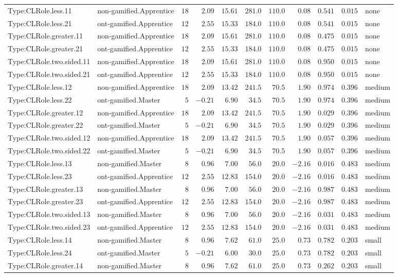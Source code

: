 \documentclass[6pt,a4paper]{article}
\begin{document}
{\begin{longtable}{llrrrrrrrrl}
Type:CLRole.less.11&non-gamified.Apprentice&$18$&$ 2.09$&$15.61$&$281.0$&$110.0$&$ 0.08$&$0.541$&$0.015$&none\tabularnewline
Type:CLRole.less.21&ont-gamified.Apprentice&$12$&$ 2.55$&$15.33$&$184.0$&$110.0$&$ 0.08$&$0.541$&$0.015$&none\tabularnewline
Type:CLRole.greater.11&non-gamified.Apprentice&$18$&$ 2.09$&$15.61$&$281.0$&$110.0$&$ 0.08$&$0.475$&$0.015$&none\tabularnewline
Type:CLRole.greater.21&ont-gamified.Apprentice&$12$&$ 2.55$&$15.33$&$184.0$&$110.0$&$ 0.08$&$0.475$&$0.015$&none\tabularnewline
Type:CLRole.two.sided.11&non-gamified.Apprentice&$18$&$ 2.09$&$15.61$&$281.0$&$110.0$&$ 0.08$&$0.950$&$0.015$&none\tabularnewline
Type:CLRole.two.sided.21&ont-gamified.Apprentice&$12$&$ 2.55$&$15.33$&$184.0$&$110.0$&$ 0.08$&$0.950$&$0.015$&none\tabularnewline
Type:CLRole.less.12&non-gamified.Apprentice&$18$&$ 2.09$&$13.42$&$241.5$&$ 70.5$&$ 1.90$&$0.974$&$0.396$&medium\tabularnewline
Type:CLRole.less.22&ont-gamified.Master&$ 5$&$-0.21$&$ 6.90$&$ 34.5$&$ 70.5$&$ 1.90$&$0.974$&$0.396$&medium\tabularnewline
Type:CLRole.greater.12&non-gamified.Apprentice&$18$&$ 2.09$&$13.42$&$241.5$&$ 70.5$&$ 1.90$&$0.029$&$0.396$&medium\tabularnewline
Type:CLRole.greater.22&ont-gamified.Master&$ 5$&$-0.21$&$ 6.90$&$ 34.5$&$ 70.5$&$ 1.90$&$0.029$&$0.396$&medium\tabularnewline
Type:CLRole.two.sided.12&non-gamified.Apprentice&$18$&$ 2.09$&$13.42$&$241.5$&$ 70.5$&$ 1.90$&$0.057$&$0.396$&medium\tabularnewline
Type:CLRole.two.sided.22&ont-gamified.Master&$ 5$&$-0.21$&$ 6.90$&$ 34.5$&$ 70.5$&$ 1.90$&$0.057$&$0.396$&medium\tabularnewline
Type:CLRole.less.13&non-gamified.Master&$ 8$&$ 0.96$&$ 7.00$&$ 56.0$&$ 20.0$&$-2.16$&$0.016$&$0.483$&medium\tabularnewline
Type:CLRole.less.23&ont-gamified.Apprentice&$12$&$ 2.55$&$12.83$&$154.0$&$ 20.0$&$-2.16$&$0.016$&$0.483$&medium\tabularnewline
Type:CLRole.greater.13&non-gamified.Master&$ 8$&$ 0.96$&$ 7.00$&$ 56.0$&$ 20.0$&$-2.16$&$0.987$&$0.483$&medium\tabularnewline
Type:CLRole.greater.23&ont-gamified.Apprentice&$12$&$ 2.55$&$12.83$&$154.0$&$ 20.0$&$-2.16$&$0.987$&$0.483$&medium\tabularnewline
Type:CLRole.two.sided.13&non-gamified.Master&$ 8$&$ 0.96$&$ 7.00$&$ 56.0$&$ 20.0$&$-2.16$&$0.031$&$0.483$&medium\tabularnewline
Type:CLRole.two.sided.23&ont-gamified.Apprentice&$12$&$ 2.55$&$12.83$&$154.0$&$ 20.0$&$-2.16$&$0.031$&$0.483$&medium\tabularnewline
Type:CLRole.less.14&non-gamified.Master&$ 8$&$ 0.96$&$ 7.62$&$ 61.0$&$ 25.0$&$ 0.73$&$0.782$&$0.203$&small\tabularnewline
Type:CLRole.less.24&ont-gamified.Master&$ 5$&$-0.21$&$ 6.00$&$ 30.0$&$ 25.0$&$ 0.73$&$0.782$&$0.203$&small\tabularnewline
Type:CLRole.greater.14&non-gamified.Master&$ 8$&$ 0.96$&$ 7.62$&$ 61.0$&$ 25.0$&$ 0.73$&$0.262$&$0.203$&small\tabularnewline

\end{longtable}}
\end{document}

